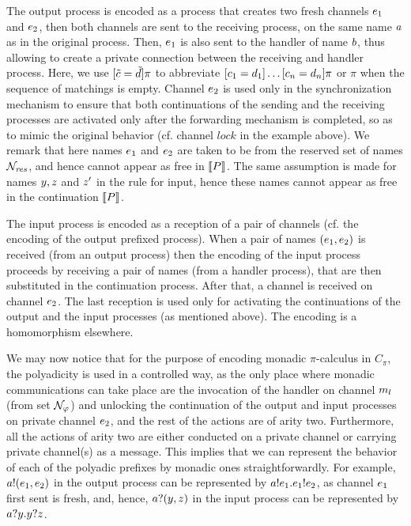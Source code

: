 The output process is encoded as a process that creates two fresh channels $e_1$ and $e_2$, then both channels are sent to the receiving process, on the same name $a$ as in the original process. Then, $e_1$ is also sent to the handler of name $b$, thus allowing to create a private connection between the receiving and handler process. Here, we use $[ \tilde{c} = \tilde{d} ]\pi$ to abbreviate $[ {c_1} = {d_1} ]\ldots[ {c_n} = {d_n} ]\pi$ or $\pi$ when the sequence of matchings is empty. Channel $e_2$ is used only in the synchronization mechanism to ensure that both continuations of the sending and the receiving processes are activated only after the forwarding mechanism is completed, so as to mimic the original behavior (cf. channel $\mathit{lock}$ in the example above).
We remark that here names $e_1$ and $e_2$ are taken to be from the reserved set of names ${\cal N}_{\mathit{res}}$, and hence cannot appear as free in  $\llbracket P \rrbracket$. 
The same assumption is made for names $y, z$ and $z'$ in the rule for input, hence these names cannot appear as free in the continuation $\llbracket P \rrbracket$. 

The input process is encoded as a reception of a pair of channels (cf. the encoding of the output prefixed process). 
When a pair of names $(e_1, e_2)$ is received (from an output process) then the encoding of the input process proceeds by receiving a pair of names (from a handler process), that are then substituted in the continuation process. After that, a channel is received on channel $e_2$.
The last reception is used only for activating the continuations of the output and the input processes (as mentioned above).
The encoding is a homomorphism elsewhere. %

We may now notice that for the purpose of encoding monadic $\pi$-calculus in $C_\pi$, the polyadicity is used in a controlled way, as the only place where monadic communications can take place are the invocation of the handler on channel $m_l$ (from set ${\cal N}_\varphi$) and unlocking the continuation of the output and input processes on private channel $e_2$, and the rest of the actions are of arity two. Furthermore, all the actions of arity two are either conducted on a private channel or carrying private channel(s) as a message. This implies that we can represent the behavior of each of the polyadic prefixes by monadic ones straightforwardly. For example, $a!(e_1, e_2)$ in the output process can be represented by $a!e_1.e_1!e_2$, as channel $e_1$ first sent is fresh, and, hence, $a?(y, z)$ in the input process can be represented by  $a?y.y?z$.






